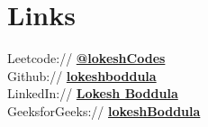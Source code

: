 \documentclass[]{deedy-resume-openfont}
\begin{document}
%
%

%
%

%
%

\begin{minipage}[t]{0.33\textwidth} 







\section{Links} 
Leetcode:// \href{https://leetcode.com/lokeshCodes/}{\bf @lokeshCodes} \\
Github:// \href{https://github.com/lokeshboddula}{\bf lokeshboddula} \\
LinkedIn:// \href{https://www.linkedin.com/in/lokesh-boddula/}{\bf 
Lokesh Boddula} \\
GeeksforGeeks://  \href{https://auth.geeksforgeeks.org/user/lokesh_22/}{\bf lokeshBoddula} \\



\end{minipage}
\end{document}
